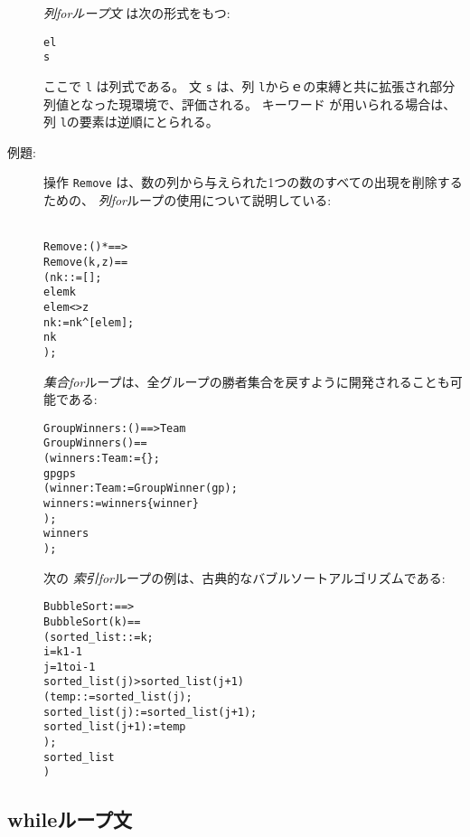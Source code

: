 \documentclass[\pformat,12pt]{jarticle}
\begin{document}
\begin{description}
 {\it 列forループ文\/} は次の形式をもつ:
  \begin{alltt}
     e  l 
    s
  \end{alltt}
ここで {\tt l} は列式である。
文 {\tt s} は、列 {\tt l}からｅの束縛と共に拡張され部分列値となった現環境で、評価される。
キーワード が用いられる場合は、列 {\tt l}の要素は逆順にとられる。

\item[例題:] 操作 \texttt{Remove} は、数の列から与えられた1つの数のすべての出現を削除するための、 \textit{列for}ループの使用について説明している: 
  \begin{alltt}\label{removeDef}
  Remove : () *  ==> 
  Remove (k,z) ==
  ( nk :  := [];
    elem  k 
      elem <> z
      nk := nk^[elem];
    nk
  );
  \end{alltt}
  \textit{集合for}ループは、全グループの勝者集合を戻すように開発されることも可能である:
  \begin{alltt}
  GroupWinners: () ==>  Team
  GroupWinners () ==
  ( winners :  Team := \{\};
    gp  gps 
     ( winner: Team := GroupWinner(gp);
      winners := winners  \{winner\}
     );
    winners
   );
  \end{alltt}
次の \textit{索引for}ループの例は、古典的なバブルソートアルゴリズムである:
  \begin{alltt}
  BubbleSort :  ==> 
  BubbleSort (k) ==
    ( sorted_list :  := k;
      i =  k  1  -1 
        j = 1 to i-1 
          sorted_list(j) > sorted_list(j+1)
          ( temp: := sorted_list(j);
               sorted_list(j) := sorted_list(j+1);
               sorted_list(j+1) := temp
              );
      sorted_list
     )
\end{alltt}
\end{description}

\subsection{whileループ文}
\end{document}
